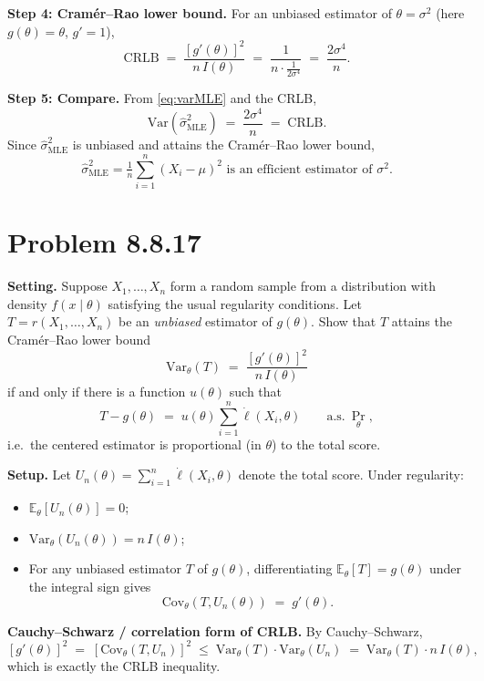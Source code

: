 \documentclass[11pt]{article}
\newcommand{\E}{\mathbb{E}}
\newcommand{\Var}{\mathrm{Var}}
\newcommand{\Cov}{\mathrm{Cov}}
\newcommand{\CRLB}{\mathrm{CRLB}}
\begin{document}
\textbf{Step 4: Cram\'er--Rao lower bound.} For an unbiased estimator of $\theta=\sigma^2$ (here $g(\theta)=\theta$, $g'=1$),
\[
\CRLB \;=\; \frac{[g'(\theta)]^2}{n\,I(\theta)} \;=\; \frac{1}{n\cdot \frac{1}{2\sigma^4}} \;=\; \frac{2\sigma^4}{n}.
\]

\textbf{Step 5: Compare.} From \eqref{eq:varMLE} and the CRLB,
\[
\Var(\hat\sigma^2_{\text{MLE}}) \;=\; \frac{2\sigma^4}{n} \;=\; \CRLB.
\]
Since $\hat\sigma^2_{\text{MLE}}$ is unbiased and attains the Cram\'er--Rao lower bound,
\[
\boxed{\;\hat\sigma^2_{\text{MLE}}=\tfrac{1}{n}\sum_{i=1}^n(X_i-\mu)^2 \text{ is an efficient estimator of }\sigma^2.\;}
\]

\bigskip
\section*{Problem 8.8.17}
\textbf{Setting.} Suppose $X_1,\dots,X_n$ form a random sample from a distribution with density $f(x\mid\theta)$ satisfying the usual regularity conditions. Let $T=r(X_1,\dots,X_n)$ be an \emph{unbiased} estimator of $g(\theta)$. Show that $T$ attains the Cram\'er--Rao lower bound
\[
\Var_\theta(T) \;=\; \frac{[g'(\theta)]^2}{n\,I(\theta)}
\]
if and only if there is a function $u(\theta)$ such that
\begin{equation}\label{eq:817main}
T - g(\theta) \;=\; u(\theta)\sum_{i=1}^n \dot\ell(X_i,\theta) \qquad \text{a.s.}\ \Pr_\theta,
\end{equation}
i.e.\ the centered estimator is proportional (in $\theta$) to the total score.

\textbf{Setup.} Let $U_n(\theta)=\sum_{i=1}^n \dot\ell(X_i,\theta)$ denote the total score. Under regularity:
\begin{itemize}
\item $\E_\theta[U_n(\theta)] = 0$;
\item $\Var_\theta(U_n(\theta)) = n\,I(\theta)$;
\item For any unbiased estimator $T$ of $g(\theta)$, differentiating $\E_\theta[T]=g(\theta)$ under the integral sign gives
\begin{equation}\label{eq:817cov}
\Cov_\theta(T, U_n(\theta)) \;=\; g'(\theta).
\end{equation}
\end{itemize}

\textbf{Cauchy--Schwarz / correlation form of CRLB.} By Cauchy--Schwarz,
\[
[g'(\theta)]^2 \;=\; [\Cov_\theta(T, U_n)]^2 \;\le\; \Var_\theta(T)\cdot \Var_\theta(U_n) \;=\; \Var_\theta(T)\cdot n\,I(\theta),
\]
which is exactly the CRLB inequality.
\end{document}
